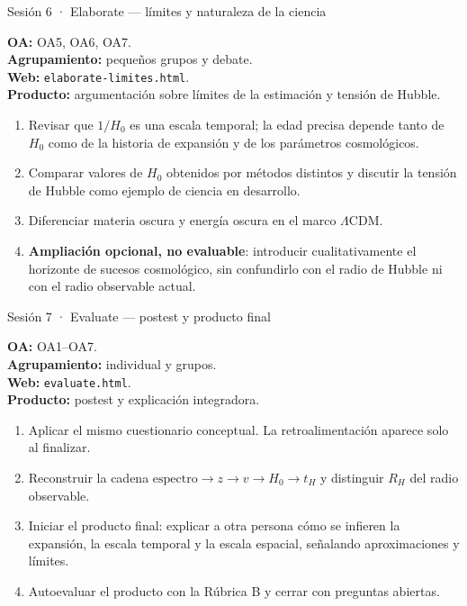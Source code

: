 \begin{guiaficha}{Sesión 6 · Elaborate --- límites y naturaleza de la ciencia}
\begin{guiameta}
\textbf{OA:} OA5, OA6, OA7.\\
\textbf{Agrupamiento:} pequeños grupos y debate.\\
\textbf{Web:} \texttt{elaborate-limites.html}.\\
\textbf{Producto:} argumentación sobre límites de la estimación y tensión de Hubble.
\end{guiameta}
\begin{enumerate}[leftmargin=*,itemsep=2pt]
\item {} Revisar que $1/H_0$ es una escala temporal; la edad precisa depende tanto de $H_0$ como de la historia de expansión y de los parámetros cosmológicos.
\item {} Comparar valores de $H_0$ obtenidos por métodos distintos y discutir la tensión de Hubble como ejemplo de ciencia en desarrollo.
\item {} Diferenciar materia oscura y energía oscura en el marco $\Lambda$CDM.
\item {} \textbf{Ampliación opcional, no evaluable}: introducir cualitativamente el horizonte de sucesos cosmológico, sin confundirlo con el radio de Hubble ni con el radio observable actual.
\end{enumerate}
\end{guiaficha}

\begin{guiaficha}{Sesión 7 · Evaluate --- postest y producto final}
\begin{guiameta}
\textbf{OA:} OA1--OA7.\\
\textbf{Agrupamiento:} individual y grupos.\\
\textbf{Web:} \texttt{evaluate.html}.\\
\textbf{Producto:} postest y explicación integradora.
\end{guiameta}
\begin{enumerate}[leftmargin=*,itemsep=2pt]
\item {} Aplicar el mismo cuestionario conceptual. La retroalimentación aparece solo al finalizar.
\item {} Reconstruir la cadena $\mathrm{espectro}\rightarrow z\rightarrow v\rightarrow H_0\rightarrow t_H$ y distinguir $R_H$ del radio observable.
\item {} Iniciar el producto final: explicar a otra persona cómo se infieren la expansión, la escala temporal y la escala espacial, señalando aproximaciones y límites.
\item {} Autoevaluar el producto con la Rúbrica B y cerrar con preguntas abiertas.
\end{enumerate}
\end{guiaficha}

